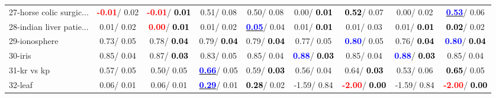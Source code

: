 \begin{table}[h]
\begin{center}
\begin{tabular}{lc|c|c|c|c|c|c|c}
27-horse colic surgic... & \textcolor{red}{\textbf{ -0.01}}/  0.02 & \textcolor{red}{\textbf{ -0.01}}/\textcolor{black}{\textbf{  0.01}} &   0.51/  0.08 &   0.50/  0.08 &   0.00/\textcolor{black}{\textbf{  0.01}} & \textcolor{black}{\textbf{  0.52}}/  0.07 &   0.00/  0.02 & \underline{\textcolor{blue}{\textbf{  0.53}}}/  0.06 \\
28-indian liver patie... &   0.01/  0.02 & \textcolor{red}{\textbf{  0.00}}/\textcolor{black}{\textbf{  0.01}} &   0.01/  0.02 & \underline{\textcolor{blue}{\textbf{  0.05}}}/  0.04 &   0.01/\textcolor{black}{\textbf{  0.01}} &   0.01/  0.03 &   0.01/\textcolor{black}{\textbf{  0.01}} & \textcolor{black}{\textbf{  0.02}}/  0.02 \\ \hline
29-ionosphere &   0.73/  0.05 &   0.78/\textcolor{black}{\textbf{  0.04}} &   0.79/\textcolor{black}{\textbf{  0.04}} &   0.79/\textcolor{black}{\textbf{  0.04}} &   0.77/  0.05 & \textcolor{blue}{\textbf{  0.80}}/  0.05 &   0.76/\textcolor{black}{\textbf{  0.04}} & \textcolor{blue}{\textbf{  0.80}}/\textcolor{black}{\textbf{  0.04}} \\
30-iris &   0.85/  0.04 &   0.87/\textcolor{black}{\textbf{  0.03}} &   0.83/  0.05 &   0.85/  0.04 & \textcolor{blue}{\textbf{  0.88}}/\textcolor{black}{\textbf{  0.03}} &   0.85/  0.04 & \textcolor{blue}{\textbf{  0.88}}/\textcolor{black}{\textbf{  0.03}} &   0.85/  0.04 \\
31-kr vs kp &   0.57/  0.05 &   0.50/  0.05 & \underline{\textcolor{blue}{\textbf{  0.66}}}/  0.05 &   0.59/\textcolor{black}{\textbf{  0.03}} &   0.56/  0.04 &   0.64/\textcolor{black}{\textbf{  0.03}} &   0.53/  0.06 & \textcolor{black}{\textbf{  0.65}}/  0.05 \\
32-leaf &   0.06/  0.01 &   0.06/  0.01 & \underline{\textcolor{blue}{\textbf{  0.29}}}/  0.01 & \textcolor{black}{\textbf{  0.28}}/  0.02 &  -1.59/  0.84 & \textcolor{red}{\textbf{ -2.00}}/\textcolor{black}{\textbf{  0.00}} &  -1.59/  0.84 & \textcolor{red}{\textbf{ -2.00}}/\textcolor{black}{\textbf{  0.00}} \\\end{tabular}\label{stratsALCKappa0bSVM}
\end{center}
\end{table}
